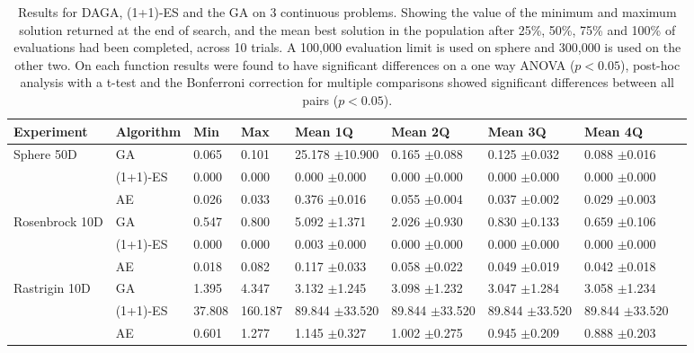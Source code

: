 \documentclass[runningheads,a4paper]{llncs}
\begin{document}
 \begin{table}[t!]
    \begin{tabular}{ | p{1.8cm} | l | l | l | l | l | l | l | l | |}
    \hline
    Experiment & Algorithm & Min & Max & Mean 1Q & Mean 2Q & Mean 3Q & Mean 4Q \\ \hline
    Sphere 50D & GA & 0.065 & 0.101 & 25.178 \(\pm\)10.900 & 0.165 \(\pm\)0.088 & 0.125 \(\pm\)0.032 & 0.088 \(\pm\)0.016\\
    & (1+1)-ES & 0.000 & 0.000 & 0.000 \(\pm\)0.000 & 0.000 \(\pm\)0.000 & 0.000 \(\pm\)0.000 & 0.000 \(\pm\)0.000\\
    & AE & 0.026 & 0.033 & 0.376 \(\pm\)0.016 & 0.055 \(\pm\)0.004 & 0.037 \(\pm\)0.002 & 0.029 \(\pm\)0.003\\\hline
    Rosenbrock 10D & GA & 0.547 & 0.800 & 5.092 \(\pm\)1.371 & 2.026 \(\pm\)0.930 & 0.830 \(\pm\)0.133 & 0.659 \(\pm\)0.106\\
    & (1+1)-ES & 0.000 & 0.000 & 0.003 \(\pm\)0.000 & 0.000 \(\pm\)0.000 & 0.000 \(\pm\)0.000 & 0.000 \(\pm\)0.000\\
    & AE & 0.018 & 0.082 & 0.117 \(\pm\)0.033 & 0.058 \(\pm\)0.022 & 0.049 \(\pm\)0.019 & 0.042 \(\pm\)0.018\\\hline
     Rastrigin 10D & GA & 1.395 & 4.347 & 3.132 \(\pm\)1.245 & 3.098 \(\pm\)1.232 & 3.047 \(\pm\)1.284 & 3.058 \(\pm\)1.234\\ 
    & (1+1)-ES & 37.808 & 160.187 & 89.844 \(\pm\)33.520 & 89.844 \(\pm\)33.520 & 89.844 \(\pm\)33.520 & 89.844 \(\pm\)33.520\\
    & AE & 0.601 & 1.277 & 1.145 \(\pm\)0.327 & 1.002 \(\pm\)0.275 & 0.945 \(\pm\)0.209 & 0.888 \(\pm\)0.203\\\hline
    \end{tabular}
    \label{table:continuous_results}
    \caption{Results for DAGA, (1+1)-ES and the GA on 3 continuous problems. Showing the value of the minimum and maximum solution returned at the end of search, and the mean best solution in the population after 25\%, 50\%, 75\% and 100\% of evaluations had been completed, across 10 trials. A 100,000 evaluation limit is used on sphere and 300,000 is used on the other two.  On each function results were found to have significant differences on a one way ANOVA (\(p<0.05\)), post-hoc analysis with a t-test and the Bonferroni correction for multiple comparisons showed significant differences between all pairs (\(p<0.05\)).}
\end{table}
\end{document}
